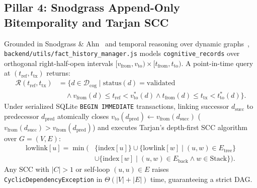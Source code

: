 \documentclass[10pt,twocolumn]{article}
\begin{document}
\subsection{Pillar 4: Snodgrass Append-Only Bitemporality and Tarjan SCC}
Grounded in Snodgrass \& Ahn~\cite{E12} and temporal reasoning over dynamic graphs~\cite{E14}, \texttt{backend/utils/fact\_history\_manager.js} models \texttt{cognitive\_records} over orthogonal right-half-open intervals $[v_{\mathrm{from}}, v_{\mathrm{to}}) \times [t_{\mathrm{from}}, t_{\mathrm{to}})$. A point-in-time query at $(t_{\mathrm{ref}}, t_{\mathrm{tx}})$ returns:
\begin{equation}
\begin{aligned}
\mathcal{R}(t_{\mathrm{ref}}, t_{\mathrm{tx}}) &= \bigl\{ d \in \mathcal{D}_{\mathrm{cog}} \;\big|\; \mathrm{status}(d)=\text{validated} \\
&\quad \land v_{\mathrm{from}}(d) \le t_{\mathrm{ref}} < v_{\mathrm{to}}^{*}(d) \land t_{\mathrm{from}}(d) \le t_{\mathrm{tx}} < t_{\mathrm{to}}^{*}(d) \bigr\}.
\end{aligned}
\end{equation}
Under serialized SQLite \texttt{BEGIN IMMEDIATE} transactions, linking successor $d_{\mathrm{succ}}$ to predecessor $d_{\mathrm{pred}}$ atomically closes $v_{\mathrm{to}}(d_{\mathrm{pred}}) \leftarrow v_{\mathrm{from}}(d_{\mathrm{succ}})$ ($v_{\mathrm{from}}(d_{\mathrm{succ}}) > v_{\mathrm{from}}(d_{\mathrm{pred}})$) and executes Tarjan's depth-first SCC algorithm~\cite{E13} over $G=(V,E)$:
\begin{equation}
\begin{aligned}
\mathrm{lowlink}[u] = \min\bigl(&\{\mathrm{index}[u]\} \cup \{\mathrm{lowlink}[w] \mid (u,w) \in E_{\mathrm{tree}}\} \\
&\cup \{\mathrm{index}[w] \mid (u,w) \in E_{\mathrm{back}} \land w \in \mathrm{Stack}\}\bigr).
\end{aligned}
\end{equation}
Any SCC with $|C|>1$ or self-loop $(u,u)\in E$ raises \texttt{CyclicDependencyException} in $\Theta(|V|+|E|)$ time, guaranteeing a strict DAG.
\end{document}
